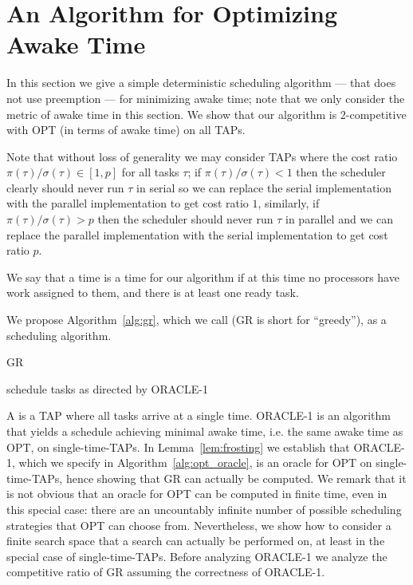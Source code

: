 \section{An Algorithm for Optimizing Awake Time} 
\label{sec:awaketime}
In this section we give a simple deterministic scheduling
algorithm --- that does not use preemption --- for minimizing
awake time; note that we only consider the metric of awake time
in this section. We show that our algorithm is $2$-competitive
with OPT (in terms of awake time) on all TAPs.

Note that without loss of generality we may consider TAPs where
the cost ratio $\pi(\tau)/\sigma(\tau) \in [1,p]$ for all tasks
$\tau$; if $\pi(\tau)/\sigma(\tau) < 1$ then the scheduler
clearly should never run $\tau$ in serial so we can replace the
serial implementation with the parallel implementation to get
cost ratio $1$, similarly, if $\pi(\tau)/\sigma(\tau) > p$ then
the scheduler should never run $\tau$ in parallel and we can
replace the parallel implementation with the serial
implementation to get cost ratio $p$.

We say that a time is a  time for our algorithm if at
this time no processors have work assigned to them, and there is at
least one ready task.

We propose Algorithm~\ref{alg:gr}, which we call 
(GR is short for \enquote{greedy}), as a scheduling algorithm.

\begin{algorithm}
  \caption{GR}
  \label{alg:gr}
  \begin{algorithmic}
        \State schedule tasks as directed by ORACLE-1 
      \EndIf
    \EndWhile
  \end{algorithmic}
\end{algorithm}

A  is a TAP where all tasks arrive at a
single time. ORACLE-1 is an algorithm that yields a schedule
achieving minimal awake time, i.e. the same awake time as OPT,
on single-time-TAPs. In Lemma~\ref{lem:frosting} we establish
that ORACLE-1, which we specify in
Algorithm~\ref{alg:opt_oracle}, is an oracle for OPT on
single-time-TAPs, hence showing that GR can actually be computed.
We remark that it is not obvious that an oracle for OPT can be
computed in finite time, even in this special case: there are an
uncountably infinite number of possible scheduling strategies
that OPT can choose from. Nevertheless, we show how to consider a
finite search space that a search can actually be performed on,
at least in the special case of single-time-TAPs. Before
analyzing ORACLE-1 we analyze the competitive ratio of GR
assuming the correctness of ORACLE-1. 

